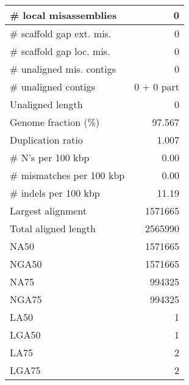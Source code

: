 \documentclass[12pt,a4paper]{article}
\begin{document}
\begin{table}[ht]
\begin{center}
\begin{tabular}{|l*{1}{|r}|}
\# local misassemblies & 0 \\ \hline
\# scaffold gap ext. mis. & 0 \\ \hline
\# scaffold gap loc. mis. & 0 \\ \hline
\# unaligned mis. contigs & 0 \\ \hline
\# unaligned contigs & 0 + 0 part \\ \hline
Unaligned length & 0 \\ \hline
Genome fraction (\%) & 97.567 \\ \hline
Duplication ratio & 1.007 \\ \hline
\# N's per 100 kbp & 0.00 \\ \hline
\# mismatches per 100 kbp & 0.00 \\ \hline
\# indels per 100 kbp & 11.19 \\ \hline
Largest alignment & 1571665 \\ \hline
Total aligned length & 2565990 \\ \hline
NA50 & 1571665 \\ \hline
NGA50 & 1571665 \\ \hline
NA75 & 994325 \\ \hline
NGA75 & 994325 \\ \hline
LA50 & 1 \\ \hline
LGA50 & 1 \\ \hline
LA75 & 2 \\ \hline
LGA75 & 2 \\ \hline
\end{tabular}
\end{center}
\end{table}
\end{document}
